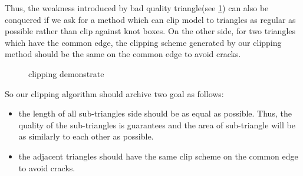 \documentclass[3p]{elsarticle}
\begin{document}
Thus, the weakness introduced by bad quality triangle(see \ref{fig:clip_quality}) can also be conquered if we ask for a method which can clip model to triangles as regular as possible rather than clip against knot boxes. On the other side, for two triangles which have the common edge, the clipping scheme generated by our clipping method should be the same on the common edge to avoid cracks.

\begin{figure}
  \centering
  \hfill
  \hfill
  \caption{clipping demonstrate}
  \label{fig:clip_quality}
\end{figure}

So our clipping algorithm should archive two goal as follows:
\begin{itemize}
    \item the length of all sub-triangles side should be as equal as possible. Thus, the quality of the sub-triangles is guarantees and the area of sub-triangle will be as similarly to each other as possible.
    \item the adjacent triangles should have the same clip scheme on the common edge to avoid cracks.
\end{itemize}
\end{document}

